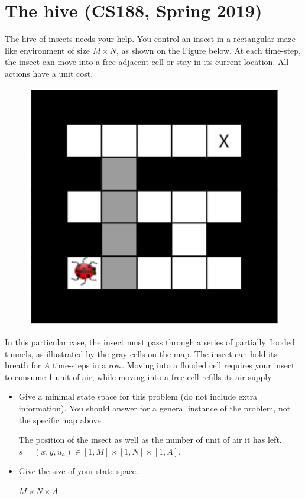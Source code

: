 \documentclass[11pt, a4paper]{article}
\begin{document}
\newpage

\section{The hive (CS188, Spring 2019)}

The hive of insects needs your help. You control an insect in a rectangular maze-like environment of size $M \times N$, as shown on the Figure below. At each time-step, the insect can move into a free adjacent cell or stay in its current location. All actions have a unit cost.

\begin{figure}[h]
    \centering
    \includegraphics[width=0.3\linewidth]{figures/e1_hive.png}
\end{figure}

In this particular case, the insect must pass through a series of partially flooded tunnels, as illustrated by the gray cells on the map. The insect can hold its breath for $A$ time-steps in a row. Moving into a flooded cell requires your insect to consume 1 unit of air, while moving into a free cell refills its air supply.

\begin{itemize}
    \item Give a minimal state space for this problem (do not include extra information). You should answer for a general instance of the problem, not the specific map above.

    \begin{solution}
        The position of the insect  as well as the number of unit of air it has left. $s = (x, y, u_a) \in [1, M] \times [1, N] \times [1, A]$.
    \end{solution}

    \item Give the size of your state space.

    \begin{solution}
        $M\times N \times A$
    \end{solution}
\end{itemize}

\newpage
\end{document}
